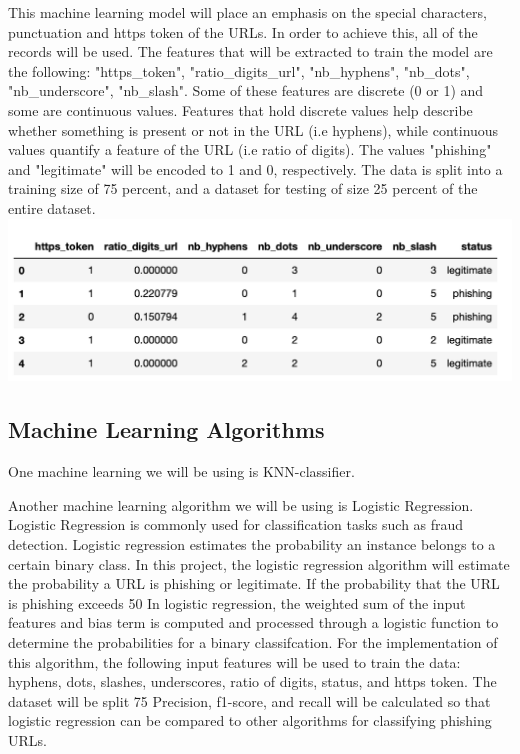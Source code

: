 \documentclass[conference]{IEEEtran}
\begin{document}
This machine learning model will place an emphasis on the special characters, punctuation and https token of the URLs. In order to achieve this, all of the records will be used. The features that will be extracted to train the model are the following: "https_token", "ratio_digits_url", "nb_hyphens", "nb_dots", "nb_underscore", "nb_slash". Some of these features are discrete (0 or 1) and some are continuous values. Features that hold discrete values help describe whether something is present or not in the URL (i.e hyphens), while continuous values quantify a feature of the URL (i.e ratio of digits). The values "phishing" and "legitimate" will be encoded to 1 and 0, respectively. The data is split into a training size of 75 percent, and a dataset for testing of size 25 percent of the entire dataset.  
\includegraphics{dataset.png}

\subsection{Machine Learning Algorithms}
One machine learning we will be using is KNN-classifier. 

Another machine learning algorithm we will be using is Logistic Regression. Logistic Regression is commonly used for classification tasks such as fraud detection. Logistic regression estimates the probability an instance belongs to a certain binary class. In this project, the logistic regression algorithm will estimate the probability a URL is phishing or legitimate. 
If the probability that the URL is phishing exceeds 50%
In logistic regression, the weighted sum of the input features and bias term is computed and processed through a logistic function to determine the probabilities for a binary classifcation. For the implementation of this algorithm, the following input features will be used to train the data: hyphens, dots, slashes, underscores, ratio of digits, status, and https token. The dataset will be split 75%
Precision, f1-score, and recall will be calculated so that logistic regression can be compared to other algorithms for classifying phishing URLs.  
\end{document}
